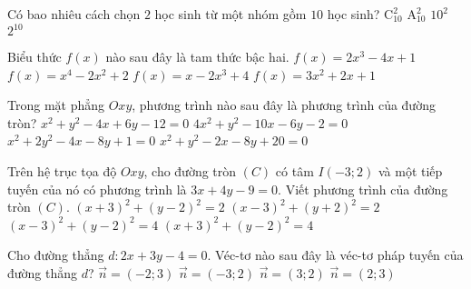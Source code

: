 \begin{ex}%
	Có bao nhiêu cách chọn $2$ học sinh từ một nhóm gồm $10$ học sinh?
	\choice
	{\True $\mathrm{C}_{10}^2$}
	{$\mathrm{A}_{10}^2$}
	{$10^2$}
	{$2^{10}$}
\end{ex}

\begin{ex}%
	Biểu thức $f(x)$ nào sau đây là tam thức bậc hai.
	\choice
	{$f(x)=2x^3 - 4x + 1$}
	{$f(x)=x^4 - 2x^2 + 2$}
	{$f(x)=x - 2x^3 + 4$}
	{\True $f(x)=3x^2 + 2x + 1$}
\end{ex}

\begin{ex}%
	Trong mặt phẳng $Oxy$, phương trình nào sau đây là phương trình của đường tròn?
	\choice
	{\True $x^2 + y^2 - 4x + 6y - 12=0$}
	{$4x^2 + y^2 - 10x - 6y - 2=0$}
	{$x^2 + 2y^2 - 4x - 8y + 1=0$}
	{$x^2 + y^2 - 2x - 8y + 20=0$}
\end{ex}

\begin{ex}%
	Trên hệ trục tọa độ $Oxy$, cho đường tròn $(C)$ có tâm $I(-3;2)$ và một tiếp tuyến của nó có phương trình là $3x+4y-9=0$. Viết phương trình của đường tròn $(C)$.
	\choice
	{$(x + 3)^2 + (y - 2)^2=2$}
	{$(x - 3)^2 + (y + 2)^2=2$}
	{$(x - 3)^2 + (y - 2)^2=4$}
	{\True $(x + 3)^2 + (y - 2)^2=4$}
\end{ex}

\begin{ex}%
	Cho đường thẳng $d\colon 2x+3y-4=0$. Véc-tơ nào sau đây là véc-tơ pháp tuyến của đường thẳng $d$?
	\choice
	{$\vec{n}=(-2;3)$}
	{$\vec{n}=(-3;2)$}
	{$\vec{n}=(3;2)$}
	{\True $\vec{n}=(2;3)$}
\end{ex}

